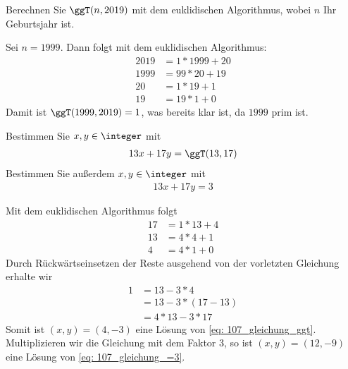 \begin{uebungsblatt}
	\setcounter{taskcount}{105}
	
	\begin{uebung}[Vorbereitung]
		Berechnen Sie $\ggT(n, 2019)$ mit dem euklidischen Algorithmus, wobei $n$ Ihr Geburtsjahr ist.
	\end{uebung}
	\begin{loesung}
		Sei $n=1999$. Dann folgt mit dem euklidischen Algorithmus:
		\begin{align*}
			2019 &= 1*1999 + 20 \\
			1999 &= 99*20  + 19 \\
			20   &= 1*19   + 1 \\
			19   &= 19*1   + 0 
		\end{align*}
		Damit ist $\ggT(1999,2019) = 1$, was bereits klar ist, da $1999$ prim ist.
	\end{loesung}

	\begin{uebung}[Vorbereitung]
		Bestimmen Sie $x,y \in \integer$ mit
		\begin{align}
		13x + 17y = \ggT(13,17) \label{eq: 107_gleichung_ggt}
		\end{align}
		Bestimmen Sie außerdem $x,y \in \integer$ mit 
		\begin{align}
		13x + 17y = 3 \label{eq: 107_gleichung_=3}
		\end{align}
	\end{uebung}
	\begin{loesung}
		Mit dem euklidischen Algorithmus folgt
		\begin{align*}
			17 &= 1*13 + 4 \\
			13 &= 4* 4 + 1 \\
			4  &= 4* 1 + 0
		\end{align*}
		Durch Rückwärtseinsetzen der Reste ausgehend von der vorletzten Gleichung erhalte wir
		\begin{align*}
			1 &= 13 - 3*4 \\
			&= 13 - 3*(17-13) \\
			&= 4*13 - 3*17
		\end{align*}
		Somit ist $(x,y) = (4,-3)$ eine Lösung von \cref{eq: 107_gleichung_ggt}. Multiplizieren wir die Gleichung mit dem Faktor $3$, so ist $(x,y) = (12,-9)$ eine Lösung von \cref{eq: 107_gleichung_=3}.
	\end{loesung}


\end{uebungsblatt}
